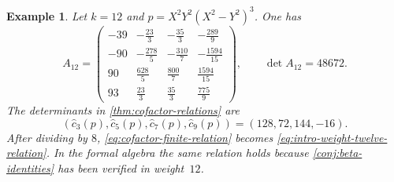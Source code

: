 \documentclass[12pt]{amsart}
\numberwithin{equation}{section}
\theoremstyle{plain}
\newtheorem{ex}[ex]{Example}
\begin{document}
\begin{ex}\label{ex:weight-twelve-transfer-relation}
Let $k=12$ and $p=X^2Y^2(X^2-Y^2)^3$. One has
\[
 A_{12}=
 \begin{pmatrix}
  -39&-\frac{23}{3}&-\frac{35}{3}&-\frac{289}{9}\\[2pt]
  -90&-\frac{278}{5}&-\frac{310}{7}&-\frac{1594}{15}\\[2pt]
  90&\frac{628}{5}&\frac{800}{7}&\frac{1594}{15}\\[2pt]
  93&\frac{23}{3}&\frac{35}{3}&\frac{775}{9}
 \end{pmatrix},
 \qquad \det A_{12}=48672.
\]
The determinants in \cref{thm:cofactor-relations} are
\[
 (\widehat c_3(p),\widehat c_5(p),\widehat c_7(p),\widehat c_9(p))
 =(128,72,144,-16).
\]
After dividing by $8$, \eqref{eq:cofactor-finite-relation} becomes
\eqref{eq:intro-weight-twelve-relation}. In the formal algebra the same
relation holds because \cref{conj:beta-identities} has been verified in
weight~$12$.
\end{ex}
\end{document}
